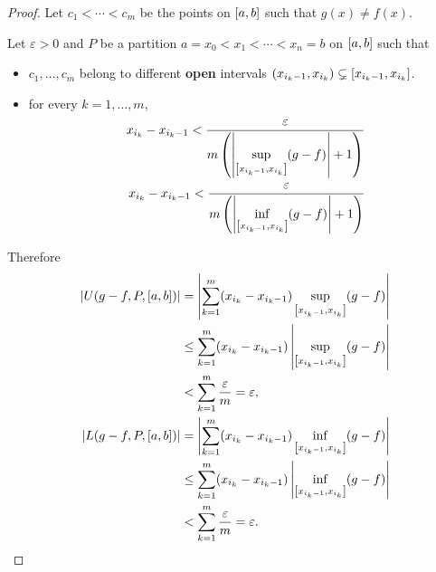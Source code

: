 \begin{proof}
    Let $c_{1} < \cdots < c_{m}$ be the points on $\left[{a, b}\right]$ such that $g(x)\ne f(x)$.

    Let $\varepsilon > 0$ and $P$ be a partition $a = x_{0} < x_{1} < \cdots < x_{n} = b$ on $\left[{a, b}\right]$ such that
    \begin{itemize}
        \item $c_{1}, \ldots, c_{m}$ belong to different \textbf{open} intervals $\left({x_{i_{k}-1}, x_{i_{k}}}\right)\subsetneq\left[{x_{i_{k} - 1}, x_{i_{k}}}\right]$.
        \item for every $k = 1,\ldots,m$,
              \[
                  \begin{split}
                      x_{i_{k}} - x_{i_{k} - 1} < \frac{\varepsilon}{m \left(\left\vert{\sup\limits_{\left[{x_{i_{k} - 1}, x_{i_{k}}}\right]}(g - f)}\right\vert + 1\right)} \\
                      x_{i_{k}} - x_{i_{k} - 1} < \frac{\varepsilon}{m \left(\left\vert{\inf\limits_{\left[{x_{i_{k} - 1}, x_{i_{k}}}\right]}(g - f)}\right\vert + 1\right)}
                  \end{split}
              \]
    \end{itemize}

    Therefore
    \begin{align*}
        \left\vert{U(g - f, P, \left[{a, b}\right])}\right\vert & = \left\vert{\sum^{m}_{k=1}(x_{i_{k}} - x_{i_{k} - 1})\sup\limits_{\left[{x_{i_{k} - 1}, x_{i_{k}}}\right]}(g - f)}\right\vert    \\
                                                 & \leq \sum^{m}_{k=1}(x_{i_{k}} - x_{i_{k} - 1})\left\vert{\sup\limits_{\left[{x_{i_{k} - 1}, x_{i_{k}}}\right]}(g - f)}\right\vert \\
                                                 & < \sum^{m}_{k=1}\frac{\varepsilon}{m} = \varepsilon,                                                               \\
        \left\vert{L(g - f, P, \left[{a, b}\right])}\right\vert & = \left\vert{\sum^{m}_{k=1}(x_{i_{k}} - x_{i_{k} - 1})\inf\limits_{\left[{x_{i_{k} - 1}, x_{i_{k}}}\right]}(g - f)}\right\vert    \\
                                                 & \leq \sum^{m}_{k=1}(x_{i_{k}} - x_{i_{k} - 1})\left\vert{\inf\limits_{\left[{x_{i_{k} - 1}, x_{i_{k}}}\right]}(g - f)}\right\vert \\
                                                 & < \sum^{m}_{k=1}\frac{\varepsilon}{m} = \varepsilon.
    \end{align*}


\end{proof}
